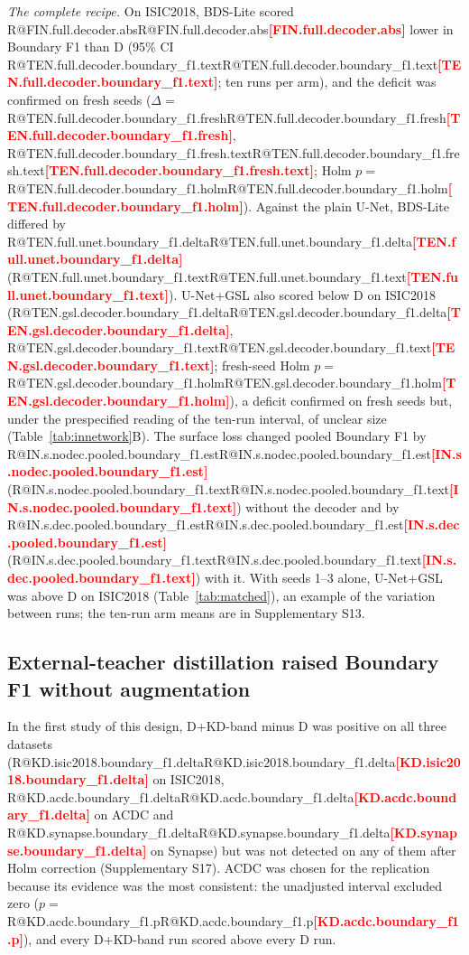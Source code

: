 \documentclass[fleqn,10pt,lineno]{wlpeerj}
\makeatletter
\newcommand{\R}[1]{\ifcsname R@#1\endcsname\csname R@#1\endcsname\else\textbf{\textcolor{red}{[#1]}}\fi}
\makeatother
\begin{document}
\emph{The complete recipe.} On ISIC2018, BDS-Lite scored \R{FIN.full.decoder.abs} lower in Boundary F1 than D (95\% CI \R{TEN.full.decoder.boundary_f1.text}; ten runs per arm), and the deficit was confirmed on fresh seeds ($\Delta=$\,\R{TEN.full.decoder.boundary_f1.fresh}, \R{TEN.full.decoder.boundary_f1.fresh.text}; Holm $p=$\,\R{TEN.full.decoder.boundary_f1.holm}). Against the plain U-Net, BDS-Lite differed by \R{TEN.full.unet.boundary_f1.delta} (\R{TEN.full.unet.boundary_f1.text}). U-Net+GSL also scored below D on ISIC2018 (\R{TEN.gsl.decoder.boundary_f1.delta}, \R{TEN.gsl.decoder.boundary_f1.text}; fresh-seed Holm $p=$\,\R{TEN.gsl.decoder.boundary_f1.holm}), a deficit confirmed on fresh seeds but, under the prespecified reading of the ten-run interval, of unclear size (Table~\ref{tab:innetwork}B). The surface loss changed pooled Boundary F1 by \R{IN.s.nodec.pooled.boundary_f1.est} (\R{IN.s.nodec.pooled.boundary_f1.text}) without the decoder and by \R{IN.s.dec.pooled.boundary_f1.est} (\R{IN.s.dec.pooled.boundary_f1.text}) with it. With seeds 1--3 alone, U-Net+GSL was above D on ISIC2018 (Table~\ref{tab:matched}), an example of the variation between runs; the ten-run arm means are in Supplementary S13.

\begin{table}[!tb]
\centering

\caption{\label{tab:innetwork}Boundary F1 contrasts for the boundary components; $\Delta$ is the first arm minus the second. A: pooled, inverse-variance fixed-effect summary of the three datasets. B: fresh-seed estimates use seeds 4--10, with Holm correction over the six contrasts. Forest plot and other metrics: Supplementary S13.}
\end{table}

\subsection*{External-teacher distillation raised Boundary F1 without augmentation}
In the first study of this design, D+KD-band minus D was positive on all three datasets (\R{KD.isic2018.boundary_f1.delta} on ISIC2018, \R{KD.acdc.boundary_f1.delta} on ACDC and \R{KD.synapse.boundary_f1.delta} on Synapse) but was not detected on any of them after Holm correction (Supplementary S17). ACDC was chosen for the replication because its evidence was the most consistent: the unadjusted interval excluded zero ($p=$\,\R{KD.acdc.boundary_f1.p}), and every D+KD-band run scored above every D run.
\end{document}
